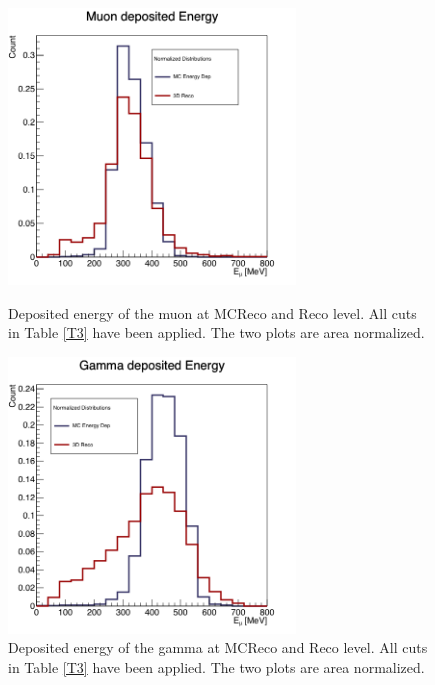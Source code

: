 \documentclass[a4paper, 10pt]{article}
\begin{document}
\begin{figure}[phbt]
\centering
\begin{minipage}{0.45\textwidth}
\centering
\includegraphics[width=3in]{pMuGamma/MuonSame.png}
\caption{Deposited energy  of the  muon at MCReco and Reco level. All cuts in Table \ref{T3} have been applied. The two plots are area normalized.}
\label{F4}
\end{minipage}\hfill
\begin{minipage}{0.45\textwidth}
\centering
\includegraphics[width=3in]{pMuGamma/GammaSame.png}
\caption{Deposited energy  of the  gamma at MCReco and Reco level. All cuts in Table \ref{T3} have been applied. The two plots are area normalized.}
\label{F5}
\end{minipage}
\end{figure}
\end{document}

